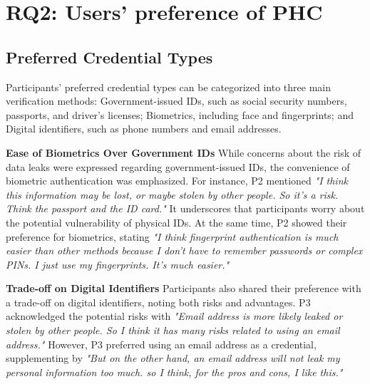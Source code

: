 \section{RQ2: Users’ preference of PHC}

\subsection{Preferred Credential Types}
Participants' preferred credential types can be categorized into three main verification methods:  Government-issued IDs, such as social security numbers, passports, and driver's licenses;  Biometrics, including face and fingerprints; and  Digital identifiers, such as phone numbers and email addresses.

\textbf{Ease of Biometrics Over Government IDs} While concerns about the risk of data leaks were expressed regarding government-issued IDs, the convenience of biometric authentication was emphasized. For instance, P2 mentioned \textit{"I think this information may be lost, or maybe stolen by other people. So it's a risk. Think the passport and the ID card."} It underscores that participants worry about the potential vulnerability of physical IDs. At the same time, P2 showed their preference for biometrics, stating \textit{"I think fingerprint authentication is much easier than other methods because I don't have to remember passwords or complex PINs. I just use my fingerprints. It's much easier." } 

\textbf{Trade-off on Digital Identifiers} Participants also shared their preference with a trade-off on digital identifiers, noting both risks and advantages. P3 acknowledged the potential risks with \textit{"Email address is more likely leaked or stolen by other people. So I think it has many risks related to using an email address."} However, P3 preferred using an email address as a credential, supplementing by \textit{"But on the other hand, an email address will not leak my personal information too much. so I think, for the pros and cons, I like this."} 

